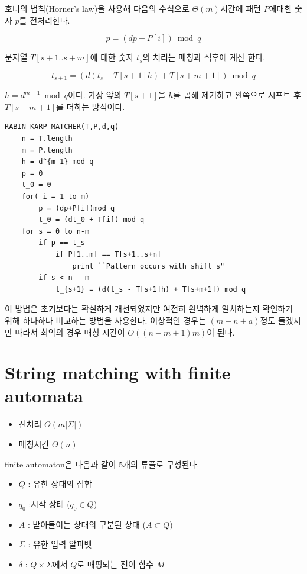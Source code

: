 호너의 법칙(Horner's law)을 사용해 다음의 수식으로 $\Theta(m)$시간에 패턴 $P$에대한 숫자 $p$를 전처리한다.

$$p = (dp+P[i]) \bmod q$$

문자열 $T[s+1..s+m]$에 대한 숫자 $t_s$의 처리는 매칭과 직후에 계산 한다.

$$t_{s+1} = (d(t_s - T[s+1]h) + T[s+m+1]) \bmod q$$

$ h = d^{m-1} \bmod q$이다. 가장 앞의 $T[s+1]$을 $h$를 곱해 제거하고 왼쪽으로 시프트 후 $T[s+m+1]$를 더하는 방식이다.



\begin{lstlisting}[style = CStyle]
RABIN-KARP-MATCHER(T,P,d,q)
    n = T.length
    m = P.length
    h = d^{m-1} mod q
    p = 0
    t_0 = 0
    for( i = 1 to m)
        p = (dp+P[i])mod q
        t_0 = (dt_0 + T[i]) mod q
    for s = 0 to n-m
        if p == t_s
            if P[1..m] == T[s+1..s+m]
                print ``Pattern occurs with shift s"
        if s < n - m
            t_{s+1} = (d(t_s - T[s+1]h) + T[s+m+1]) mod q
\end{lstlisting}

이 방법은 초기보다는 확실하게 개선되었지만 여전히 완벽하게 일치하는지 확인하기 위해 하나하나 비교하는 방법을 사용한다. 이상적인 경우는 $(m-n+a)$정도 돌겠지만  따라서 최악의 경우 매칭 시간이 $O((n-m+1)m)$이 된다.

\section{String matching with finite automata}

\begin{itemize}
    \item 전처리 $O(m|\Sigma|)$
    \item 매칭시간 $\Theta(n)$
\end{itemize}

\begin{dfn}[automata]
    finite automaton은 다음과 같이 5개의 튜플로 구성된다.
    \begin{itemize}
        \item $Q$ : 유한 상태의 집합
        \item $q_0$ :시작 상태 ($q_0 \in Q$)
        \item $A$ : 받아들이는 상태의 구분된 상태 ($A \subset Q$)
        \item $\Sigma$ : 유한 입력 알파벳
        \item $\delta$ : $Q \times \Sigma$에서 $Q$로 매핑되는 전이 함수 $M$    \end{itemize}
\end{dfn}

